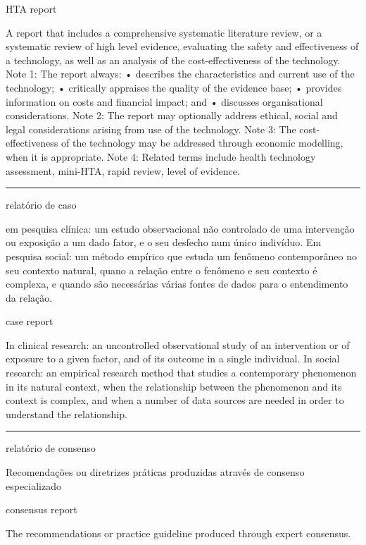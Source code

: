 \documentclass[
  openany]{book}
\begin{document}
HTA report

A report that includes a comprehensive systematic literature review, or a systematic review of high level evidence, evaluating the safety and effectiveness of a technology, as well as an analysis of the cost-effectiveness of the technology. Note 1: The report always: • describes the characteristics and current use of the technology; • critically appraises the quality of the evidence base; • provides information on costs and financial impact; and • discusses organisational considerations. Note 2: The report may optionally address ethical, social and legal considerations arising from use of the technology. Note 3: The cost-effectiveness of the technology may be addressed through economic modelling, when it is appropriate. Note 4: Related terms include health technology assessment, mini-HTA, rapid review, level of evidence.

\begin{center}\rule{0.5\linewidth}{0.5pt}\end{center}

relatório de caso

em pesquisa clínica: um estudo observacional não controlado de uma intervenção ou exposição a um dado fator, e o seu desfecho num único indivíduo. Em pesquisa social: um método empírico que estuda um fenômeno contemporâneo no seu contexto natural, quano a relação entre o fenômeno e seu contexto é complexa, e quando são necessárias várias fontes de dados para o entendimento da relação.

case report

In clinical research: an uncontrolled observational study of an intervention or of exposure to a given factor, and of its outcome in a single individual. In social research: an empirical research method that studies a contemporary phenomenon in its natural context, when the relationship between the phenomenon and its context is complex, and when a number of data sources are needed in order to understand the relationship.

\begin{center}\rule{0.5\linewidth}{0.5pt}\end{center}

relatório de consenso

Recomendações ou diretrizes práticas produzidas através de consenso especializado

consensus report

The recommendations or practice guideline produced through expert consensus.
\end{document}
